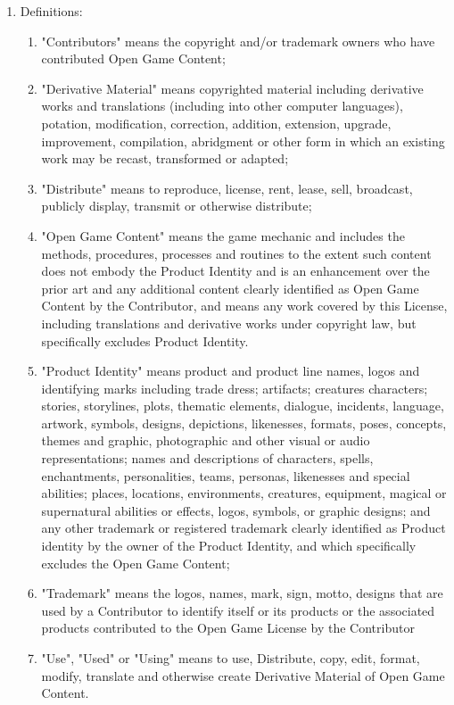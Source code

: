 \begin{enumerate}\item Definitions: 
\begin{enumerate}
 \item "Contributors" means the copyright and/or trademark owners who have contributed Open Game Content;
 \item "Derivative Material" means copyrighted material including derivative works and translations (including into other computer languages), potation, modification, correction, addition, extension, upgrade, improvement, compilation, abridgment or other form in which an existing work may be recast, transformed or adapted;
 \item "Distribute" means to reproduce, license, rent, lease, sell, broadcast, publicly display, transmit or otherwise distribute; 
 \item "Open Game Content" means the game mechanic and includes the methods, procedures, processes and routines to the extent such content does not embody the Product Identity and is an enhancement over the prior art and any additional content clearly identified as Open Game Content by the Contributor, and means any work covered by this License, including translations and derivative works under copyright law, but specifically excludes Product Identity.
 \item "Product Identity" means product and product line names, logos and identifying marks including trade dress; artifacts; creatures characters; stories, storylines, plots, thematic elements, dialogue, incidents, language, artwork, symbols, designs, depictions, likenesses, formats, poses, concepts, themes and graphic, photographic and other visual or audio representations; names and descriptions of characters, spells, enchantments, personalities, teams, personas, likenesses and special abilities; places, locations, environments, creatures, equipment, magical or supernatural abilities or effects, logos, symbols, or graphic designs; and any other trademark or registered trademark clearly identified as Product identity by the owner of the Product Identity, and which specifically excludes the Open Game Content;
 \item "Trademark" means the logos, names, mark, sign, motto, designs that are used by a Contributor to identify itself or its products or the associated products contributed to the Open Game License by the Contributor
 \item "Use", "Used" or "Using" means to use, Distribute, copy, edit, format, modify, translate and otherwise create Derivative Material of Open Game Content. 

\end{enumerate}
\end{enumerate}
